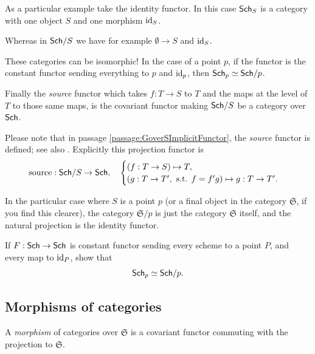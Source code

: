 \documentclass[12pt]{memoir}
\newcounter{passage}
\begin{document}
\begin{ptcb}
\begin{nonum-Ex}
As a particular example take the identity functor. In this case \(\mathsf{Sch}_S\) is a category with one object \(S\) and one morphism \(\operatorname{id}_S\).\par
Whereas in \(\mathsf{Sch}/S\) we have for example \(\emptyset\to S\) and \(\operatorname{id}_S\).
\end{nonum-Ex}

These categories can be isomorphic! In the case of a point \(p\), if the functor is the constant functor sending everything to \(p\) and \(\operatorname{id}_p\), then \(\mathsf{Sch}_p\simeq\mathsf{Sch}/p\).

\tcbline

Finally the \emph{source} functor which takes \(f:T\to S\) to \(T\) and the maps at the level of \(T\) to those same maps, is the covariant functor making \(\mathsf{Sch}/S\) be a category over \(\mathsf{Sch}\).
\end{ptcb}

\begin{ptcb}
    Please note that in passage \ref{passage:GoverSImplicitFunctor}, the \emph{source} functor is defined; see also \cite{notes:stacks-slice}. Explicitly this projection functor is 
    \[
    \text{source}:\mathsf{Sch}/S\to\mathsf{Sch},\quad\begin{cases}
        (f:T\to S)\mapsto T,\\
        (g:T\to T',\text{ s.t. }f=f'g)\mapsto g:T\to T'.
    \end{cases}
    \]
\end{ptcb}

In the particular case where $S$ is a point $p$ (or a final object in the category $\mathfrak{S}$, if you find this clearer), the category $\mathfrak{S}/p$ is just the category $\mathfrak{S}$ itself, and the natural projection is the identity functor.

\begin{ptcb}
    \begin{nonum-Ej}
    If \(F:\mathsf{Sch}\to\mathsf{Sch}\) is constant functor sending every scheme to a point \(P\), and every map to \(\operatorname{id}_P\), show that
    \[
    \mathsf{Sch}_p\simeq\mathsf{Sch}/p.
    \]
    \end{nonum-Ej}
\end{ptcb}

\subsection{Morphisms of categories}

A \emph{morphism} of categories over $\mathfrak{S}$ is a covariant functor commuting with the projection to $\mathfrak{S}$.
\end{document}
